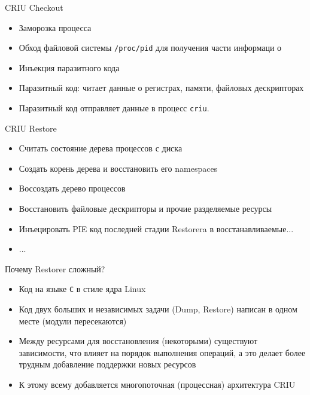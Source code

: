 \begin{frame}{CRIU Checkout}
\begin{itemize}
	\item Заморозка процесса
	\item Обход файловой системы \texttt{/proc/pid} для получения части информаци о 
	\item Инъекция паразитного кода
	\item Паразитный код: читает данные о регистрах, памяти, файловых дескрипторах
	\item Паразитный код отправляет данные в процесс \texttt{criu}.
\end{itemize}
\end{frame}


\begin{frame}{CRIU Restore}
\begin{itemize}
	\item Считать состояние дерева процессов с диска
	\item Создать корень дерева и восстановить его namespaces
	\item Воссоздать дерево процессов
	\item Восстановить файловые дескрипторы и прочие разделяемые ресурсы
	\item Инъецировать PIE код последней стадии Restorera в восстанавливаемые...
	\item ...
\end{itemize}
\end{frame}

\begin{frame}{Почему Restorer сложный?}
\begin{itemize}
	\item Код на языке \texttt{C} в стиле ядра Linux
	\item Код двух больших и независимых задачи (Dump, Restore) написан в одном месте (модули пересекаются)
	\item Между ресурсами для восстановления (некоторыми) существуют зависимости, что влияет на порядок выполнения операций, а это делает более трудным добавление поддержки новых ресурсов
	\item К этому всему добавляется многопоточная (процессная) архитектура CRIU
\end{itemize}
\end{frame}


